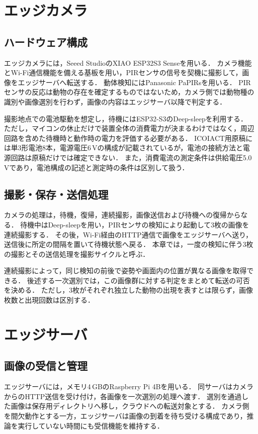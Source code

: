\section{エッジカメラ}
\subsection{ハードウェア構成}
エッジカメラには，Seeed StudioのXIAO ESP32S3 Senseを用いる．
カメラ機能とWi-Fi通信機能を備える基板を用い，PIRセンサの信号を契機に撮影して，画像をエッジサーバへ転送する．
動体検知にはPanasonic PaPIRsを用いる．
PIRセンサの反応は動物の存在を確定するものではないため，カメラ側では動物種の識別や画像選別を行わず，画像の内容はエッジサーバ以降で判定する．

撮影地点での電池駆動を想定し，待機にはESP32-S3のDeep-sleepを利用する．
ただし，マイコンの休止だけで装置全体の消費電力が決まるわけではなく，周辺回路を含めた待機時と動作時の電力を評価する必要がある．
ICOIACT用原稿には単3形電池8本，電源電圧6\,Vの構成が記載されているが，電池の接続方法と電源回路は原稿だけでは確定できない．
また，消費電流の測定条件は供給電圧5.0\,Vであり，電池構成の記述と測定時の条件は区別して扱う．

\subsection{撮影・保存・送信処理}
カメラの処理は，待機，復帰，連続撮影，画像送信および待機への復帰からなる．
待機中はDeep-sleepを用い，PIRセンサの検知により起動して3枚の画像を連続撮影する．
その後，Wi-Fi経由のHTTP通信で画像をエッジサーバへ送り，送信後に所定の間隔を置いて待機状態へ戻る．
本章では，一度の検知に伴う3枚の撮影とその送信処理を撮影サイクルと呼ぶ．

連続撮影によって，同じ検知の前後で姿勢や画面内の位置が異なる画像を取得できる．
後述する一次選別では，この画像群に対する判定をまとめて転送の可否を決める．
ただし，3枚がそれぞれ独立した動物の出現を表すとは限らず，画像枚数と出現回数は区別する．

\section{エッジサーバ}
\subsection{画像の受信と管理}
エッジサーバには，メモリ4\,GBのRaspberry Pi 4Bを用いる．
同サーバはカメラからのHTTP送信を受け付け，各画像を一次選別の処理へ渡す．
選別を通過した画像は保存用ディレクトリへ移し，クラウドへの転送対象とする．
カメラ側を間欠動作とする一方，エッジサーバは画像の到着を待ち受ける構成であり，推論を実行していない時間にも受信機能を維持する．


